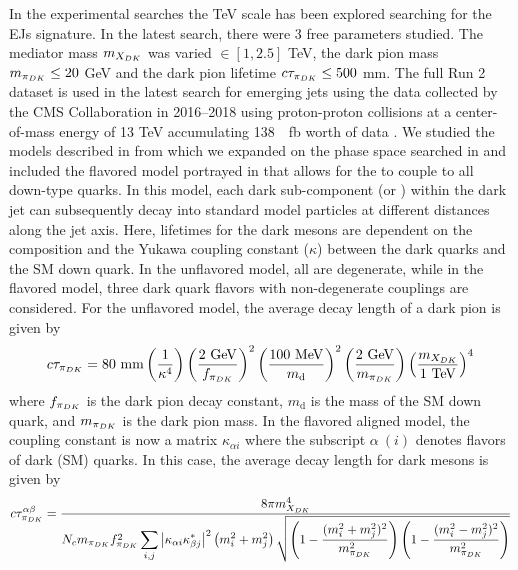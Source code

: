 In the experimental searches \cite{sirunyan2019search,CMS:2024gxp} the TeV scale has been explored searching for the EJs signature.
In the latest search, there were 3 free parameters studied. The mediator mass $m_{X_{DK}}$ was varied $\in [1,2.5]$ TeV, the dark pion mass $m_{\pi_{DK}}\leq 20$ GeV and the dark pion lifetime $c\tau_{\pi_{DK}} \leq 500$ mm.
The full Run 2 dataset is used in the latest search for emerging jets using the data collected by the CMS Collaboration in 2016--2018 using proton-proton collisions at a center-of-mass energy of 13 TeV accumulating 138~\unit{\per\femto\barn} worth of data \cite{CMS:2024gxp}.
We studied the models described in \cite{Bai_2014,Schwaller:2015gea,Renner_2018} from which we expanded on the phase space searched in \cite{sirunyan2019search} and included the flavored model portrayed in  that allows for the \Qdark to couple to all down-type quarks. In this model, each dark sub-component (or \pidark) within the dark jet can subsequently decay into standard model particles at different distances along the jet axis.
Here, lifetimes for the dark mesons are dependent on the \Qdark composition and the Yukawa coupling constant ($\kappa$) between the dark quarks and the SM down quark.
In the unflavored model, all \Qdark are degenerate, while in the flavored model, three dark quark flavors with non-degenerate couplings are considered.
For the unflavored model, the average decay length of a dark pion is given by 
\begin{equation}
	\ctaudpi = 80~\unit{mm} \pgroup{\frac{1}{\kappa^4}} \pgroup{\frac{2 ~\unit{GeV} }{f_{\pidark}}}^2 \pgroup{\frac{100 ~\unit{MeV}}{m_\text{d}} }^2 \pgroup{\frac{2~\unit{GeV}}{m_{\pidark}}} \pgroup{\frac{m_{\Mdark}}{1~\unit{TeV}}}^4
	\label{eq:unflavored-ctau}
\end{equation}
where $f_{\pi_{DK}}$ is the dark pion decay constant, $m_\text{d}$ is the mass of the SM down quark, and $m_{\pi_{DK}}$ is the dark pion mass. In the flavored aligned model, the coupling constant is now a matrix $\kappa_{\alpha i}$ where the subscript $\alpha ~(i)$ denotes flavors of dark (SM) quarks. In this case, the average decay length for dark mesons is given by 
\begin{equation}
	\small
	c\tau_{\pi_{DK}}^{\alpha \beta} = \dfrac{8\pi m^4_{X_{DK}}}{ N_c m_{\pi_{DK}} f^2_{\pi_{DK}} \displaystyle \sum_{i,j} \abs{\kappa_{\alpha i} \kappa_{\beta j}^*}^2 \left(m_i^2 + m_j^2\right) \sqrt{ \left(1- \dfrac{(m_i^2 + m_j^2)^2 }{m^2_{\pi_{DK}}} \right) \left(1- \dfrac{(m_i^2 - m_j^2)^2 }{m^2_{\pi_{DK}}} \right) } }
	\label{eq:flavored-ctau}
\end{equation}
